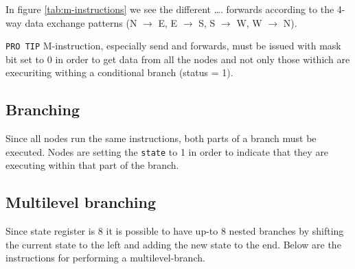 

In figure \ref{tab:m-instructions} we see the different \ldots.  forwards according to the 4-way data exchange patterns (N
$\rightarrow$ E, E $\rightarrow$ S, S $\rightarrow$ W, W $\rightarrow$ N).

{\tt PRO TIP} 
M-instruction, especially send and forwards, must be issued with mask bit set to
0 in order to get data from all the nodes and not only those withich are
execuriting withing a conditional branch (status = 1).



\subsection{Branching}
Since all nodes run the same instructions, both parts of a branch must be
executed. Nodes are setting the {\tt state} to 1 in order to indicate that they
are executing within that part of the branch.



\subsection{Multilevel branching}
Since state register is 8 it is possible to have up-to 8 nested branches by
shifting the current state to the left and adding the new state to the
end. Below  are the
instructions for performing a multilevel-branch.


